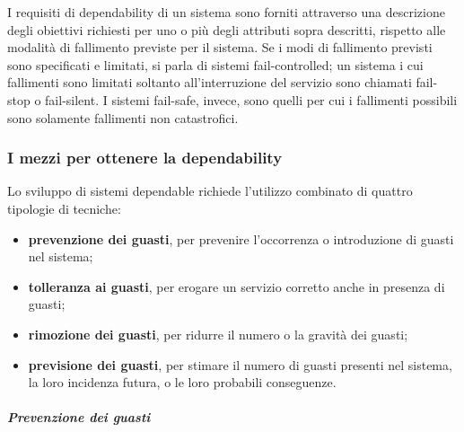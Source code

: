 \documentclass[14pt]{extarticle}
\begin{document}
I requisiti di dependability di un sistema sono forniti attraverso una descrizione degli obiettivi richiesti per uno o più degli attributi sopra descritti,
rispetto alle modalità di fallimento previste per il sistema. Se i modi di fallimento previsti sono specificati e limitati, si parla di sistemi fail-controlled; un
sistema i cui fallimenti sono limitati soltanto all'interruzione del servizio sono
chiamati fail-stop o fail-silent. I sistemi fail-safe, invece, sono quelli per cui i
fallimenti possibili sono solamente fallimenti non catastrofici.

\subsubsection{I mezzi per ottenere la dependability}
Lo sviluppo di sistemi dependable richiede l'utilizzo combinato di quattro
tipologie di tecniche:
\begin{itemize}

\item \textbf{prevenzione dei guasti}, per prevenire l'occorrenza o introduzione di
guasti nel sistema;
\item \textbf{tolleranza ai guasti}, per erogare un servizio corretto anche in presenza
di guasti;
\item \textbf{rimozione dei guasti}, per ridurre il numero o la gravità dei guasti;
\item \textbf{previsione dei guasti}, per stimare il numero di guasti presenti nel
sistema, la loro incidenza futura, o le loro probabili conseguenze.

\end{itemize}
\subparagraph{Prevenzione dei guasti}
\end{document}
